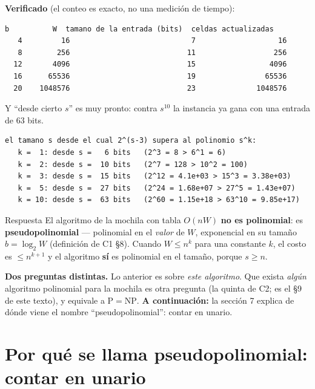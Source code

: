 \documentclass[11pt]{article}
\begin{document}
\textbf{Verificado} (el conteo es exacto, no una medición de tiempo):
\begin{lstlisting}[style=salida,basicstyle=\ttfamily\footnotesize\color{black},columns=fixed]
   b          W  tamano de la entrada (bits)  celdas actualizadas
   4         16                            7                   16
   8        256                           11                  256
  12       4096                           15                 4096
  16      65536                           19                65536
  20    1048576                           23              1048576
\end{lstlisting}
Y ``desde cierto $s$'' es muy pronto: contra $s^{10}$ la instancia ya gana con una entrada de 63 bits.
\begin{lstlisting}[style=salida,basicstyle=\ttfamily\footnotesize\color{black},columns=fixed]
el tamano s desde el cual 2^(s-3) supera al polinomio s^k:
   k =  1: desde s =   6 bits   (2^3 = 8 > 6^1 = 6)
   k =  2: desde s =  10 bits   (2^7 = 128 > 10^2 = 100)
   k =  3: desde s =  15 bits   (2^12 = 4.1e+03 > 15^3 = 3.38e+03)
   k =  5: desde s =  27 bits   (2^24 = 1.68e+07 > 27^5 = 1.43e+07)
   k = 10: desde s =  63 bits   (2^60 = 1.15e+18 > 63^10 = 9.85e+17)
\end{lstlisting}

\begin{resultado}{Respuesta}
El algoritmo de la mochila con tabla $O(nW)$ \textbf{no es polinomial}: es \textbf{pseudopolinomial} ---
polinomial en el \emph{valor} de $W$, exponencial en su tamaño $b=\log_2W$ (definición de C1 §8). Cuando
$W\le n^k$ para una constante $k$, el costo es $\le n^{k+1}$ y el algoritmo \textbf{sí} es polinomial en el
tamaño, porque $s\ge n$.
\end{resultado}

\textbf{Dos preguntas distintas.} Lo anterior es sobre \emph{este algoritmo}. Que exista \emph{algún}
algoritmo polinomial para la mochila es otra pregunta (la quinta de C2; es el §9 de este texto), y equivale a
$\mathrm{P}=\mathrm{NP}$. \textbf{A continuación:} la sección 7 explica de dónde viene el nombre ``pseudopolinomial'': contar en unario.

\section{Por qué se llama pseudopolinomial: contar en unario}
\end{document}
